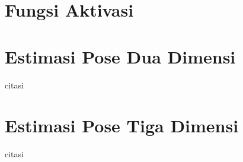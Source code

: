 \section{Fungsi Aktivasi\label{sec:2-FungsiAktivasi}}

\section{Estimasi Pose Dua Dimensi\label{sec:2-EstimasiPoseDuaDimensi}}
citasi~\cite{8765346}

\section{Estimasi Pose Tiga Dimensi\label{sec:2-EstimasiPoseTigaDimensi}}
citasi~\cite{martinez_2017_3dbaseline}